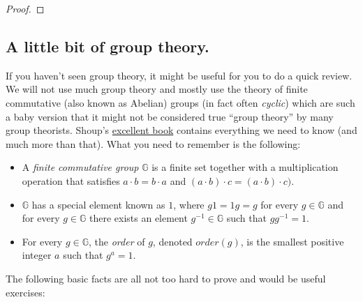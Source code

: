 \begin{proof}
\end{proof}

\subsection{A little bit of group
theory.}\label{A-little-bit-of-group-theory}

If you haven't seen group theory, it might be useful for you to do a
quick review. We will not use much group theory and mostly use the
theory of finite commutative (also known as Abelian) groups (in fact
often \emph{cyclic}) which are such a baby version that it might not be
considered true ``group theory'' by many group theorists. Shoup's
\href{http://www.shoup.net/ntb/}{excellent book} contains everything we
need to know (and much more than that). What you need to remember is the
following:

\begin{itemize}
\item
  A \emph{finite commutative group} \(\mathbb{G}\) is a finite set
  together with a multiplication operation that satisfies
  \(a\cdot b = b\cdot a\) and
  \((a\cdot b)\cdot c = (a\cdot b)\cdot c)\).
\item
  \(\mathbb{G}\) has a special element known as \(1\), where \(g1=1g=g\)
  for every \(g\in\mathbb{G}\) and for every \(g\in \mathbb{G}\) there
  exists an element \(g^{-1}\in \mathbb{G}\) such that \(gg^{-1}=1\).
\item
  For every \(g\in \mathbb{G}\), the \emph{order} of \(g\), denoted
  \(order(g)\), is the smallest positive integer \(a\) such that
  \(g^a=1\).
\end{itemize}

The following basic facts are all not too hard to prove and would be
useful exercises:

